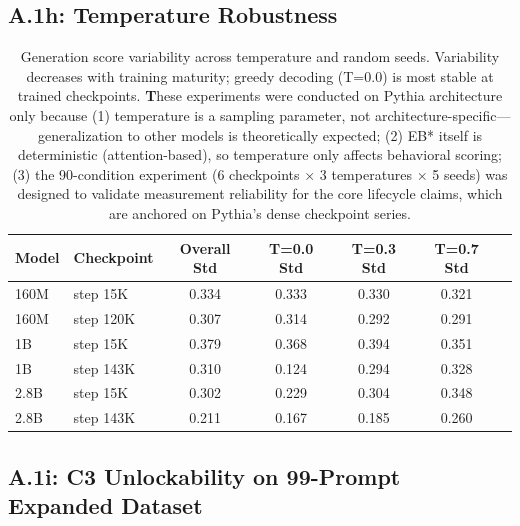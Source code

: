 \documentclass[10pt]{article} %
\begin{document}
\subsection*{A.1h: Temperature Robustness}\mbox{}

\begin{table}[H]
\centering
\small
\begin{tabular}{|l|l|c|c|c|c|c|}
\hline
\textbf{Model} & \textbf{Checkpoint} & \textbf{Overall Std} & \textbf{T=0.0 Std} & \textbf{T=0.3 Std} & \textbf{T=0.7 Std} \\
\hline
160M & step 15K & 0.334 & 0.333 & 0.330 & 0.321 \\
160M & step 120K & 0.307 & 0.314 & 0.292 & 0.291 \\
1B & step 15K & 0.379 & 0.368 & 0.394 & 0.351 \\
1B & step 143K & 0.310 & 0.124 & 0.294 & 0.328 \\
2.8B & step 15K & 0.302 & 0.229 & 0.304 & 0.348 \\
2.8B & step 143K & 0.211 & 0.167 & 0.185 & 0.260 \\
\hline
\end{tabular}
\caption{Generation score variability across temperature and random seeds. Variability decreases with training maturity; greedy decoding (T=0.0) is most stable at trained checkpoints. \textbf These experiments were conducted on Pythia architecture only because (1) temperature is a sampling parameter, not architecture-specific—generalization to other models is theoretically expected; (2) EB* itself is deterministic (attention-based), so temperature only affects behavioral scoring; (3) the 90-condition experiment (6 checkpoints $\times$ 3 temperatures $\times$ 5 seeds) was designed to validate measurement reliability for the core lifecycle claims, which are anchored on Pythia's dense checkpoint series.}
\label{tab:temperature_robustness}
\end{table}

\subsection*{A.1i: C3 Unlockability on 99-Prompt Expanded Dataset}\mbox{}
\end{document}
